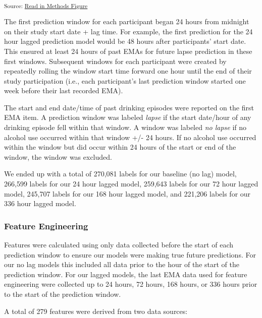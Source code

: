 \documentclass[
]{agujournal2019}
\begin{document}
\textsubscript{Source:
\href{https://jjcurtin.github.io/study_lag/notebooks/methods_figure-preview.html\#cell-fig-methods}{Read
in Methods Figure}}

The first prediction window for each participant began 24 hours from
midnight on their study start date + lag time. For example, the first
prediction for the 24 hour lagged prediction model would be 48 hours
after participants' start date. This ensured at least 24 hours of past
EMAs for future lapse prediction in these first windows. Subsequent
windows for each participant were created by repeatedly rolling the
window start time forward one hour until the end of their study
participation (i.e., each participant's last prediction window started
one week before their last recorded EMA).

The start and end date/time of past drinking episodes were reported on
the first EMA item. A prediction window was labeled \emph{lapse} if the
start date/hour of any drinking episode fell within that window. A
window was labeled \emph{no lapse} if no alcohol use occurred within
that window +/- 24 hours. If no alcohol use occurred within the window
but did occur within 24 hours of the start or end of the window, the
window was excluded.

We ended up with a total of 270,081 labels for our baseline (no lag)
model, 266,599 labels for our 24 hour lagged model, 259,643 labels for
our 72 hour lagged model, 245,707 labels for our 168 hour lagged model,
and 221,206 labels for our 336 hour lagged model.

\subsubsection{Feature Engineering}\label{feature-engineering}

Features were calculated using only data collected before the start of
each prediction window to ensure our models were making true future
predictions. For our no lag models this included all data prior to the
hour of the start of the prediction window. For our lagged models, the
last EMA data used for feature engineering were collected up to 24
hours, 72 hours, 168 hours, or 336 hours prior to the start of the
prediction window.

A total of 279 features were derived from two data sources:
\end{document}
